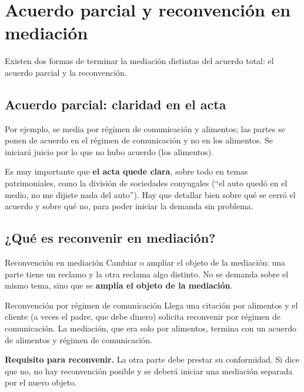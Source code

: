 \documentclass[12pt,oneside]{book}
\begin{document}
\section{Acuerdo parcial y reconvención en mediación}

Existen dos formas de terminar la mediación distintas del acuerdo total: el acuerdo parcial y la reconvención.

\subsection{Acuerdo parcial: claridad en el acta}

Por ejemplo, se media por régimen de comunicación y alimentos; las partes se ponen de acuerdo en el régimen de comunicación y no en los alimentos. Se iniciará juicio por lo que no hubo acuerdo (los alimentos).

Es muy importante que \textbf{el acta quede clara}, sobre todo en temas patrimoniales, como la división de sociedades conyugales (``el auto quedó en el medio, no me dijiste nada del auto''). Hay que detallar bien sobre qué se cerró el acuerdo y sobre qué no, para poder iniciar la demanda sin problema.

\subsection{¿Qué es reconvenir en mediación?}

\begin{definition}{Reconvención en mediación}
Cambiar o ampliar el objeto de la mediación: una parte tiene un reclamo y la otra reclama algo distinto. No se demanda sobre el mismo tema, sino que se \textbf{amplía el objeto de la mediación}.
\end{definition}

\begin{example}{Reconvención por régimen de comunicación}
Llega una citación por alimentos y el cliente (a veces el padre, que debe dinero) solicita reconvenir por régimen de comunicación. La mediación, que era solo por alimentos, termina con un acuerdo de alimentos y régimen de comunicación.
\end{example}

\begin{important}
\textbf{Requisito para reconvenir.} La otra parte debe prestar su conformidad. Si dice que no, no hay reconvención posible y se deberá iniciar una mediación separada por el nuevo objeto.
\end{important}
\end{document}
